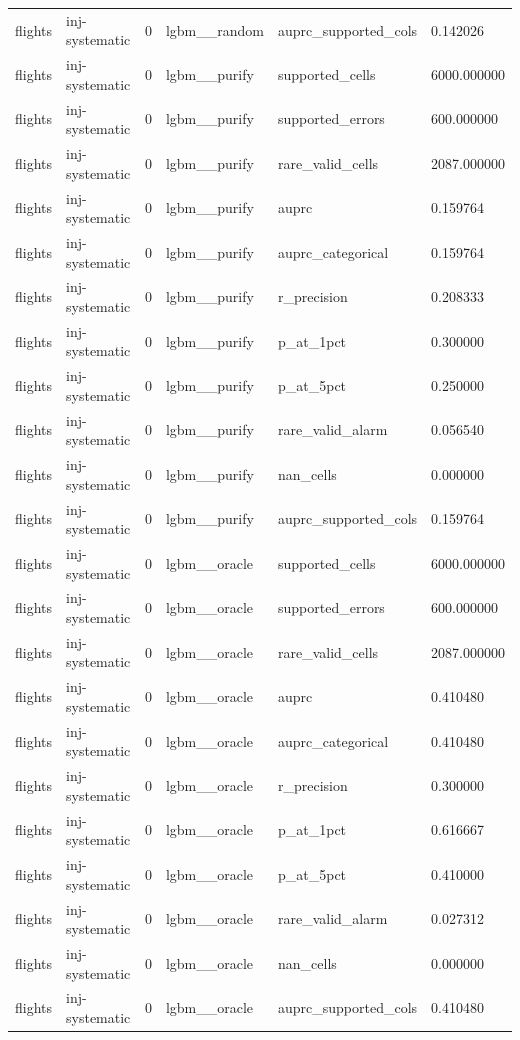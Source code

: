 \begin{tabular}{llllll}
flights & inj-systematic & 0 & lgbm\_\_random & auprc\_supported\_cols & 0.142026 \\
flights & inj-systematic & 0 & lgbm\_\_purify & supported\_cells & 6000.000000 \\
flights & inj-systematic & 0 & lgbm\_\_purify & supported\_errors & 600.000000 \\
flights & inj-systematic & 0 & lgbm\_\_purify & rare\_valid\_cells & 2087.000000 \\
flights & inj-systematic & 0 & lgbm\_\_purify & auprc & 0.159764 \\
flights & inj-systematic & 0 & lgbm\_\_purify & auprc\_categorical & 0.159764 \\
flights & inj-systematic & 0 & lgbm\_\_purify & r\_precision & 0.208333 \\
flights & inj-systematic & 0 & lgbm\_\_purify & p\_at\_1pct & 0.300000 \\
flights & inj-systematic & 0 & lgbm\_\_purify & p\_at\_5pct & 0.250000 \\
flights & inj-systematic & 0 & lgbm\_\_purify & rare\_valid\_alarm & 0.056540 \\
flights & inj-systematic & 0 & lgbm\_\_purify & nan\_cells & 0.000000 \\
flights & inj-systematic & 0 & lgbm\_\_purify & auprc\_supported\_cols & 0.159764 \\
flights & inj-systematic & 0 & lgbm\_\_oracle & supported\_cells & 6000.000000 \\
flights & inj-systematic & 0 & lgbm\_\_oracle & supported\_errors & 600.000000 \\
flights & inj-systematic & 0 & lgbm\_\_oracle & rare\_valid\_cells & 2087.000000 \\
flights & inj-systematic & 0 & lgbm\_\_oracle & auprc & 0.410480 \\
flights & inj-systematic & 0 & lgbm\_\_oracle & auprc\_categorical & 0.410480 \\
flights & inj-systematic & 0 & lgbm\_\_oracle & r\_precision & 0.300000 \\
flights & inj-systematic & 0 & lgbm\_\_oracle & p\_at\_1pct & 0.616667 \\
flights & inj-systematic & 0 & lgbm\_\_oracle & p\_at\_5pct & 0.410000 \\
flights & inj-systematic & 0 & lgbm\_\_oracle & rare\_valid\_alarm & 0.027312 \\
flights & inj-systematic & 0 & lgbm\_\_oracle & nan\_cells & 0.000000 \\
flights & inj-systematic & 0 & lgbm\_\_oracle & auprc\_supported\_cols & 0.410480 \\

\end{tabular}
